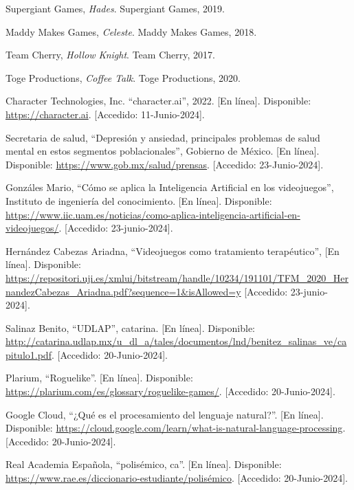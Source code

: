 \documentclass[12pt,twoside]{article}
\begin{document}
	\begin{thebibliography}{10}
	
	Supergiant Games, \textit{Hades}. Supergiant Games, 2019.
	
	Maddy Makes Games, \textit{Celeste}. Maddy Makes Games, 2018.
	
	Team Cherry, \textit{Hollow Knight}. Team Cherry, 2017.
	
	Toge Productions, \textit{Coffee Talk}. Toge Productions, 2020.
	
	Character Technologies, Inc. ``character.ai'', 2022. [En línea]. Disponible: \url{https://character.ai}. [Accedido: 11-Junio-2024].
	
	Secretaria de salud, ``Depresión y ansiedad, principales problemas de salud mental en estos segmentos poblacionales'', Gobierno de México. [En línea]. Disponible: \url{https://www.gob.mx/salud/prensas}. [Accedido: 23-Junio-2024].
	
	Gonzáles Mario, ``Cómo se aplica la Inteligencia Artificial en los videojuegos'', Instituto de ingeniería del conocimiento. [En línea]. Disponible: \url{https://www.iic.uam.es/noticias/como-aplica-inteligencia-artificial-en-videojuegos/}. [Accedido: 23-junio-2024].
	
	Hernández Cabezas Ariadna, ``Videojuegos como tratamiento terapéutico'', [En línea]. Disponible: \url{https://repositori.uji.es/xmlui/bitstream/handle/10234/191101/TFM_2020_HernandezCabezas_Ariadna.pdf?sequence=1&isAllowed=y} [Accedido: 23-junio-2024].
	
	Salinaz Benito, ``UDLAP'', catarina. [En línea]. Disponible: \url{http://catarina.udlap.mx/u_dl_a/tales/documentos/lnd/benitez_salinas_ve/capitulo1.pdf}. [Accedido: 20-Junio-2024].
	
	Plarium, ``Roguelike''. [En línea]. Disponible: \url{https://plarium.com/es/glossary/roguelike-games/}. [Accedido: 20-Junio-2024].
	
	Google Cloud, ``¿Qué es el procesamiento del lenguaje natural?''. [En línea]. Disponible: \url{https://cloud.google.com/learn/what-is-natural-language-processing}. [Accedido: 20-Junio-2024].
	
	Real Academia Española, ``polisémico, ca''. [En línea]. Disponible: \url{https://www.rae.es/diccionario-estudiante/polisémico}. [Accedido: 20-Junio-2024].
	

\end{thebibliography}
\end{document}

